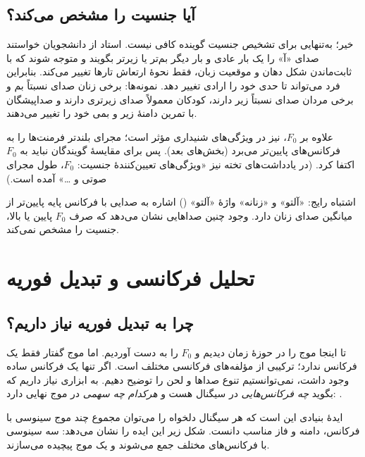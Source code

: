 \subsection{آیا  جنسیت را مشخص می‌کند؟}
خیر؛  به‌تنهایی برای تشخیص جنسیت گوینده کافی نیست. استاد از دانشجویان خواستند صدای «آ» را یک بار عادی و بار دیگر بم‌تر یا زیرتر بگویند و متوجه شوند که با ثابت‌ماندن شکل دهان و موقعیت زبان، فقط نحوهٔ ارتعاش تارها تغییر می‌کند. بنابراین فرد می‌تواند تا حدی  خود را ارادی تغییر دهد. نمونه‌ها: برخی زنان صدای نسبتاً بم و برخی مردان صدای نسبتاً زیر دارند، کودکان معمولاً صدای زیرتری دارند و صداپیشگان با تمرین دامنهٔ زیر و بمی خود را تغییر می‌دهند.

علاوه بر $F_0$،  نیز در ویژگی‌های شنیداری مؤثر است؛ مجرای بلندتر فرمنت‌ها را به فرکانس‌های پایین‌تر می‌برد (بخش‌های بعد). پس برای مقایسهٔ گویندگان نباید به $F_0$ اکتفا کرد. (در یادداشت‌های تخته نیز «ویژگی‌های تعیین‌کنندهٔ جنسیت: $F_0$، طول مجرای صوتی و \dots» آمده است.)

\begin{warningbox}{اشتباه رایج: «آلتو» و «زنانه»}
واژهٔ «آلتو» () اشاره به صدایی با فرکانس پایه پایین‌تر از میانگین صدای زنان دارد. وجود چنین صداهایی نشان می‌دهد که صرف $F_0$ پایین یا بالا، جنسیت را مشخص نمی‌کند.
\end{warningbox}

\section{تحلیل فرکانسی و تبدیل فوریه}

\subsection{چرا به تبدیل فوریه نیاز داریم؟}
تا اینجا موج را در حوزهٔ زمان دیدیم و $F_0$ را به دست آوردیم. اما موج گفتار فقط یک فرکانس ندارد؛ ترکیبی از مؤلفه‌های فرکانسی مختلف است. اگر تنها یک فرکانس ساده وجود داشت، نمی‌توانستیم تنوع صداها و لحن را توضیح دهیم. به ابزاری نیاز داریم که بگوید \emph{چه فرکانس‌هایی} در سیگنال هست و \emph{هرکدام چه سهمی} در موج نهایی دارد: .

ایدهٔ بنیادی این است که هر سیگنال دلخواه را می‌توان مجموع چند موج سینوسی با فرکانس، دامنه و فاز مناسب دانست. شکل زیر این ایده را نشان می‌دهد: سه سینوسی با فرکانس‌های مختلف جمع می‌شوند و یک موج پیچیده می‌سازند.



